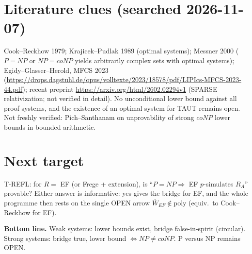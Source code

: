 \documentclass[11pt]{article}
\begin{document}
\section{Literature clues (searched 2026-11-07)}
Cook--Reckhow 1979; Krajicek--Pudlak 1989 (optimal systems); Messner 2000 ($P=NP$ or $NP=coNP$ yields arbitrarily complex sets with optimal systems);
Egidy--Glasser--Herold, MFCS 2023 (\url{https://drops.dagstuhl.de/opus/volltexte/2023/18578/pdf/LIPIcs-MFCS-2023-44.pdf}); recent preprint \url{https://arxiv.org/html/2602.02294v1}
(SPARSE relativization; not verified in detail). No unconditional lower bound against all proof systems, and the existence of an optimal system for TAUT remains open. Not freshly verified: Pich--Santhanam on unprovability of strong $coNP$ lower bounds in bounded arithmetic.

\section{Next target}
T-REFL: for $R=$ EF (or Frege + extension), is ``$P=NP\Rightarrow$ EF $p$-simulates $R_A$'' provable? Either answer is informative: yes gives the bridge for EF, and the whole programme then rests on the single OPEN arrow $\overline W_{EF}\notin\mathrm{poly}$ (equiv.\ to Cook--Reckhow for EF).

\noindent\textbf{Bottom line.} Weak systems: lower bounds exist, bridge false-in-spirit (circular). Strong systems: bridge true, lower bound $\Leftrightarrow NP\ne coNP$. P versus NP remains OPEN.
\end{document}
